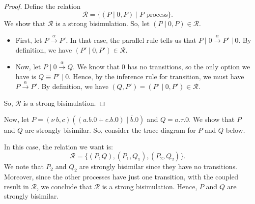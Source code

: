 \documentclass[a4paper, openany]{memoir}
\theoremstyle{definition}
\begin{document}
    \begin{proof}
        Define the relation
        \[\mathcal{R} = \{(P \mid 0, P) \mid P \textrm{ process}\}.\]
        We show that $\mathcal{R}$ is a strong bisimulation. So, let $(P \mid 0, P) \in \mathcal{R}$. 
        \begin{itemize}
            \item First, let $P \xrightarrow{\alpha} P'$. In that case, the parallel rule tells us that $P \mid 0 \xrightarrow{\alpha} P' \mid 0$. By definition, we have $(P' \mid 0, P') \in \mathcal{R}$.

            \item Now, let $P \mid 0 \xrightarrow{\alpha} Q$. We know that $0$ has no transitions, so the only option we have is $Q \equiv P' \mid 0$. Hence, by the inference rule for transition, we must have $P \xrightarrow{\alpha} P'$. By definition, we have $(Q, P') = (P' \mid 0, P') \in \mathcal{R}$.
        \end{itemize}
        So, $\mathcal{R}$ is a strong bisimulation.
    \end{proof}

    Now, let $P = (\nu \ b, c)((a.b.0 + c.b.0) \mid \overline{b}.0)$ and $Q = a.\tau.0$. We show that $P$ and $Q$ are strongly bisimilar. So, consider the trace diagram for $P$ and $Q$ below.
    \begin{figure}[H]
        \centering
    \end{figure}
    \noindent In this case, the relation we want is:
    \[\mathcal{R} = \{(P, Q), (P_1, Q_1), (P_2, Q_2)\}.\]
    We note that $P_2$ and $Q_2$ are strongly bisimilar since they have no transitions. Moreover, since the other processes have just one transition, with the coupled result in $\mathcal{R}$, we conclude that $\mathcal{R}$ is a strong bisimulation. Hence, $P$ and $Q$ are strongly bisimilar.
\end{document}
